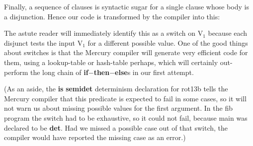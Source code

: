 \documentclass[a4paper,11pt,notitlepage,onecolumn]{book}
\begin{document}
Finally, a sequence of clauses is syntactic sugar for a single clause whose
body is a disjunction.  Hence our code is transformed by the compiler
into this:
\begin{small}

\begin{ptabular}
\nextline
{}
\nextline
{}
\nextline
{}
\nextline
{}
\nextline
{}
\nextline
{}
\nextline
{}
\nextline
\end{ptabular}

\end{small}
The astute reader will immediately identify this as a switch on \textsf{V$_{1}$} because
each disjunct tests the input \textsf{V$_{1}$} for a different possible value.  One of
the good things about switches is that the Mercury compiler will generate
very efficient code for them, using a lookup-table or hash-table perhaps,
which will certainly out-perform the long chain of \textsf{\textbf{if}{\ensuremath{-}}\textbf{then}{\ensuremath{-}}\textbf{else}}s in our
first attempt.

(As an aside, the \textsf{\textbf{is} \textbf{semidet}} determinism declaration for \textsf{rot13b} tells
the Mercury compiler that this predicate is expected to fail in some cases,
so it will not warn us about missing possible values for the first argument.
In the \textsf{fib} program the switch had to be exhaustive, so it could not fail,
because \textsf{main} was declared to be \textsf{\textbf{det}}.  Had we missed a possible case out
of that switch, the compiler would have reported the missing case as an
error.)
\end{document}
